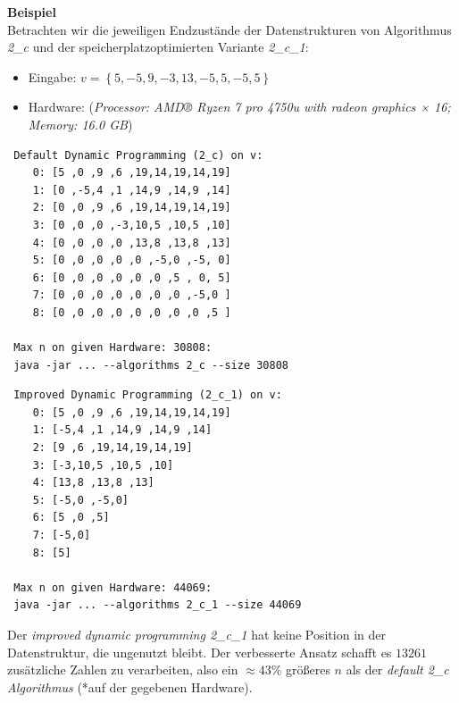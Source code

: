 \documentclass[10pt]{article}
\begin{document}
 \textbf{Beispiel}\\
 Betrachten wir die jeweiligen Endzustände der Datenstrukturen von Algorithmus \textit{2\_c} und der 
 speicherplatzoptimierten Variante \textit{2\_c\_1}:
 \begin{itemize}
     \item Eingabe: $v = \left\{5, -5, 9, -3, 13, -5, 5, -5, 5\right\}$
     \item Hardware: (\textit{Processor: AMD® Ryzen 7 pro 4750u with radeon graphics × 16; Memory: 16.0 GB})
 \end{itemize}

\begin{verbatim}
 Default Dynamic Programming (2_c) on v:
    0: [5 ,0 ,9 ,6 ,19,14,19,14,19]
    1: [0 ,-5,4 ,1 ,14,9 ,14,9 ,14]
    2: [0 ,0 ,9 ,6 ,19,14,19,14,19]
    3: [0 ,0 ,0 ,-3,10,5 ,10,5 ,10]
    4: [0 ,0 ,0 ,0 ,13,8 ,13,8 ,13]
    5: [0 ,0 ,0 ,0 ,0 ,-5,0 ,-5, 0]
    6: [0 ,0 ,0 ,0 ,0 ,0 ,5 , 0, 5]
    7: [0 ,0 ,0 ,0 ,0 ,0 ,0 ,-5,0 ]
    8: [0 ,0 ,0 ,0 ,0 ,0 ,0 ,0 ,5 ]
                               
 Max n on given Hardware: 30808:
 java -jar ... --algorithms 2_c --size 30808
\end{verbatim}

\begin{verbatim}
 Improved Dynamic Programming (2_c_1) on v:
    0: [5 ,0 ,9 ,6 ,19,14,19,14,19]
    1: [-5,4 ,1 ,14,9 ,14,9 ,14]
    2: [9 ,6 ,19,14,19,14,19]
    3: [-3,10,5 ,10,5 ,10]
    4: [13,8 ,13,8 ,13]
    5: [-5,0 ,-5,0]
    6: [5 ,0 ,5]
    7: [-5,0]
    8: [5]

 Max n on given Hardware: 44069:
 java -jar ... --algorithms 2_c_1 --size 44069
\end{verbatim}

Der \textit{improved dynamic programming 2\_c\_1} hat keine Position in der 
Datenstruktur, die ungenutzt bleibt. Der verbesserte Ansatz schafft es $13261$ zusätzliche
Zahlen zu verarbeiten, also ein $\approx 43\%$ grö\ss eres $n$ als der \textit{default 2\_c Algorithmus} 
(*auf der gegebenen Hardware).
\end{document}
